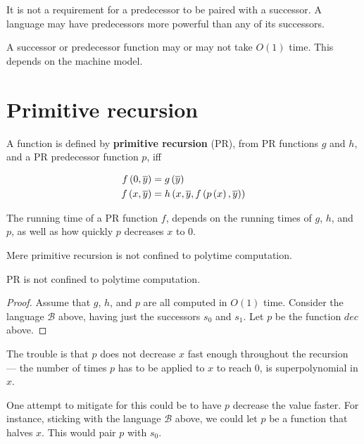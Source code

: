 It is not a requirement for a predecessor to be paired with a successor. A
language may have predecessors more powerful than any of its successors.

\begin{remark}

A successor or predecessor function may or may not take $O(1)$ time. This
depends on the machine model.

\end{remark}

\section{Primitive recursion}

\begin{definition}

A function is defined by \textbf{primitive recursion} (PR), from PR functions
$g$ and $h$, and a PR predecessor function $p$, iff

\begin{align}
f\left({0,\overline{y}}\right) &= g\left({\overline{y}}\right) \\
f\left({x, \overline{y}}\right) &= h\left({x, \overline{y}, f\left({p\left({x}\right),\overline{y}}\right)}\right)
\end{align}

\end{definition}

The running time of a PR function $f$, depends on the running times of $g$,
$h$, and $p$, as well as how quickly $p$ decreases $x$ to $0$.

Mere primitive recursion is not confined to polytime computation.

\begin{theorem}
PR is not confined to polytime computation.
\end{theorem}

\begin{proof} Assume that $g$, $h$, and $p$ are all computed in $O(1)$ time.
Consider the language $\mathcal{B}$ above, having just the successors $s_0$ and
$s_1$. Let $p$ be the function $dec$ above.\end{proof}

The trouble is that $p$ does not decrease $x$ fast enough throughout the
recursion --- the number of times $p$ has to be applied to $x$ to reach $0$, is
superpolynomial in $x$.

One attempt to mitigate for this could be to have $p$ decrease the value
faster. For instance, sticking with the language $\mathcal{B}$ above, we could
let $p$ be a function that halves $x$. This would pair $p$ with $s_0$.

